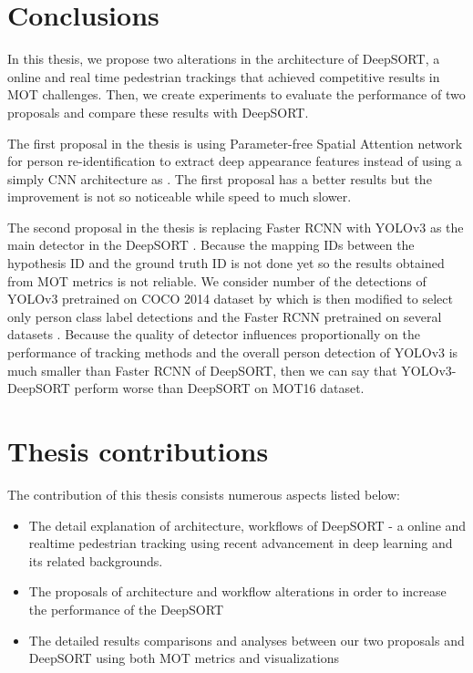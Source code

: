 \section{Conclusions}
\hspace{0.45cm} In this thesis, we propose two alterations in the architecture of DeepSORT\cite{Wojke2017simple}, a online and real time pedestrian trackings that achieved competitive results in MOT challenges. Then, we create experiments to evaluate the performance of two proposals and compare these results with DeepSORT.\par
The first proposal in the thesis is using Parameter-free Spatial Attention network for person re-identification \cite{SA} to extract deep appearance features instead of using a simply CNN architecture as \cite{Wojke2017simple}. The first proposal has a better results but the improvement is not so noticeable while speed to much slower.\par
The second proposal in the thesis is replacing Faster \acrshort{RCNN} with YOLOv3 as the main detector in the DeepSORT \cite{Wojke2017simple}. Because the mapping IDs between the hypothesis ID and the ground truth ID is not done yet so the results obtained from MOT metrics is not reliable. We consider number of the detections of YOLOv3 pretrained on COCO 2014 dataset by \cite{yolov3} which is then modified to select only person class label detections  and the Faster \acrshort{RCNN} pretrained on several datasets \cite{Wojke2017simple}.
Because the quality of detector influences proportionally on the performance of tracking methods and the overall person detection of YOLOv3\cite{yolov3}
is much smaller than Faster \acrshort{RCNN} of DeepSORT\cite{Wojke2017simple}, then we can say that YOLOv3-DeepSORT perform worse than DeepSORT\cite{Wojke2017simple}
on MOT16 dataset.

\section{Thesis contributions}
The contribution of this thesis consists numerous aspects listed below:
\begin{itemize}
    \item The detail explanation of architecture, workflows of DeepSORT\cite{Wojke2017simple} - a online and realtime pedestrian tracking
     using recent advancement in deep learning and its related backgrounds.
    \item The proposals of architecture and workflow alterations in order to increase the performance of the DeepSORT\cite{Wojke2017simple}
    \item The detailed results comparisons and analyses between our two proposals and DeepSORT\cite{Wojke2017simple} using both MOT metrics\cite{Milan2016MOT16AB} and visualizations
\end{itemize}
